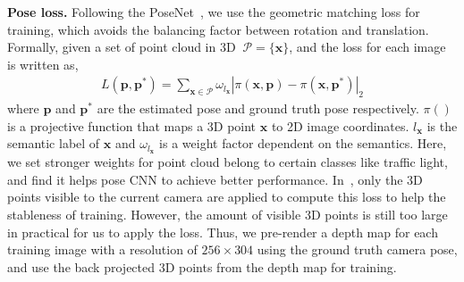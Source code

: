 \documentclass[10pt,twocolumn,letterpaper]{article}
\newcommand{\ve}[1]{{\mathbf #1}} %
\newcommand{\hua}[1]{{\mathcal #1}}
\begin{document}
\textbf{Pose loss.}
Following the PoseNet~\cite{kendall2017geometric}, we use the geometric matching loss for training, which avoids the balancing factor between rotation and translation.
Formally, given a set of point cloud in 3D $~\hua{P}=\{\ve{x}\}$, and the loss for each image is written as,
{\vspace{-0.5\baselineskip}
\begin{align}
L(\ve{p}, \ve{p}^*) = \sum_{\ve{x} \in \hua{P}}\omega_{l_\ve{x}}|\pi(\ve{x}, \ve{p}) - \pi(\ve{x}, \ve{p}^*)|_2
\label{eq:proj_loss}
\end{align}
}
where $\ve{p}$ and $\ve{p}^*$ are the estimated pose and ground truth pose respectively. $\pi()$ is a projective function that maps a 3D point $\ve{x}$ to 2D image coordinates. $l_\ve{x}$ is the semantic label of $\ve{x}$ and $\omega_{l_\ve{x}}$ is a weight factor dependent on the semantics. Here, we set stronger weights for point cloud belong to certain classes like traffic light, and find it helps pose CNN to achieve better performance.
In~\cite{kendall2017geometric}, only the 3D points visible to the current camera are applied to compute this loss to help the stableness of training. However, the amount of visible 3D points is still too large in practical for us to apply the loss.
Thus, we pre-render a depth map for each training image with a resolution of $256 \times 304$ using the ground truth camera pose, and use the back projected 3D points from the depth map for training.
\end{document}
